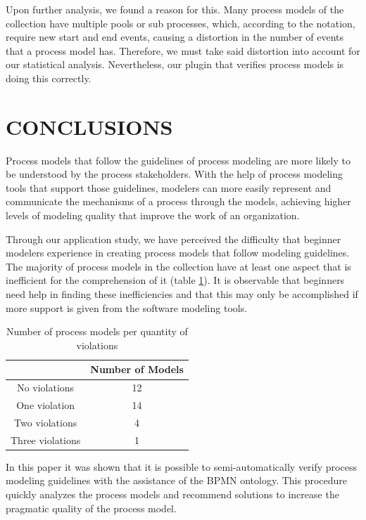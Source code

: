 \documentclass[a4paper,twoside]{article}
\begin{document}
Upon further analysis, we found a reason for this. Many process models of the collection have multiple pools or sub processes, which, according to the notation, require new start and end events, causing a distortion in the number of events that a process model has. Therefore, we must take said distortion into account for our statistical analysis. Nevertheless, our plugin that verifies process models is doing this correctly.





\section{CONCLUSIONS}\label{Conclusion}

\noindent Process models that follow the guidelines of process modeling are more likely to be understood by the process stakeholders. With the help of process modeling tools that support those guidelines, modelers can more easily represent and communicate the mechanisms of a process through the models, achieving higher levels of modeling quality that improve the work of an organization.

Through our application study, we have perceived the difficulty that beginner modelers experience in creating process models that follow modeling guidelines. The majority of process models in the collection have at least one aspect that is inefficient for the comprehension of it (table \ref{ModelsPerQuantityOfViolation}). It is observable that beginners need help in finding these inefficiencies and that this may only be accomplished if more support is given from the software modeling tools.

\begin{table}[]
	\centering
	\caption{Number of process models per quantity of violations}
	\label{ModelsPerQuantityOfViolation}
	\begin{tabular}{|c|c|}
		\hline
		& Number of Models \\ \hline
		No violations & 12 \\ \hline
		One violation & 14 \\ \hline
		Two violations & 4 \\ \hline
		Three violations & 1 \\ \hline
	\end{tabular}
\end{table}

In this paper it was shown that it is possible to semi-automatically verify process modeling guidelines with the assistance of the BPMN ontology. This procedure quickly analyzes the process models and recommend solutions to increase the pragmatic quality of the process model. %
\end{document}
